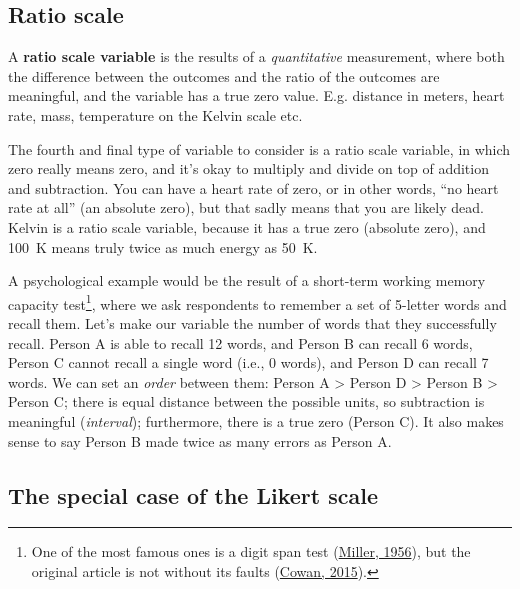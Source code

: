 \documentclass[
  11pt,
  a4paper,
  twoside,symmetric,openright]{book}
\theoremstyle{break}
\theoremstyle{break}
\begin{document}
\hypertarget{ratioscale}{%
\subsection{Ratio scale}\label{ratioscale}}

\begin{definition}
\protect\hypertarget{def:defratio}{}\label{def:defratio}A \textbf{ratio scale variable} is the results of a \emph{quantitative} measurement, where both the difference between the outcomes and the ratio of the outcomes are meaningful, and the variable has a true zero value. E.g. distance in meters, heart rate, mass, temperature on the Kelvin scale etc.
\end{definition}

The fourth and final type of variable to consider is a ratio scale variable, in which zero really means zero, and it's okay to multiply and divide on top of addition and subtraction. You can have a heart rate of zero, or in other words, ``no heart rate at all'' (an absolute zero), but that sadly means that you are likely dead. Kelvin is a ratio scale variable, because it has a true zero (absolute zero), and 100~K means truly twice as much energy as 50~K.

\begin{example}
\protect\hypertarget{exm:exratio}{}\label{exm:exratio}A psychological example would be the result of a short-term working memory capacity test\footnote{One of the most famous ones is a digit span test (\protect\hyperlink{ref-millerMagicalNumberSeven1956}{Miller, 1956}), but the original article is not without its faults (\protect\hyperlink{ref-cowanGeorgeMillerMagical2015}{Cowan, 2015}).}, where we ask respondents to remember a set of 5-letter words and recall them. Let's make our variable the number of words that they successfully recall. Person A is able to recall 12 words, and Person B can recall 6 words, Person C cannot recall a single word (i.e., 0 words), and Person D can recall 7 words. We can set an \emph{order} between them: Person A \textgreater{} Person D \textgreater{} Person B \textgreater{} Person C; there is equal distance between the possible units, so subtraction is meaningful (\emph{interval}); furthermore, there is a true zero (Person C). It also makes sense to say Person B made twice as many errors as Person A.
\end{example}

\hypertarget{likertscale}{%
\subsection{The special case of the Likert scale}\label{likertscale}}
\end{document}
